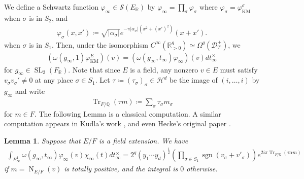 \documentclass[11pt]{article} %
\newcommand{\8}{\infty}
\newcommand{\SL}{\operatorname{SL}}
\newcommand{\KM}{\operatorname{KM}}
\newcommand{\D}{\mathcal{D}}
\newcommand{\HH}{\mathscr{H}}
\newcommand{\R}{\mathbb{R}}
\newcommand{\Q}{\mathbb{Q}}
\newcommand{\Tr}{\operatorname{Tr}}
\newcommand{\N}{\operatorname{N}}
\newcommand{\sgn}{\operatorname{sgn}}
\newcommand{\Scal}{\mathcal{S}}
\theoremstyle{mytheoremstyle}
\newtheorem{lem}[thm]{Lemma}
\theoremstyle{remark}
\numberwithin{equation}{section}
\begin{document}
\subsubsection{}  We define a Schwartz function $\varphi_\8 \in \Scal(E_\R)$ by $\varphi_\8=\prod_\sigma \varphi_\sigma$ where $\varphi_\sigma=\varphi_{\KM}^\sigma$ when $\sigma$ is in $S_2$, and 
 \begin{align}
    \varphi_\sigma(x,x') \coloneqq \sqrt{\vert \alpha_\sigma \vert} e^{- \pi \vert \alpha_\sigma \vert \left ( x^2+(x')^2\right )} \left ( x+x' \right ).
\end{align}
when $\sigma$ is in $S_1$. Then, under the isomorphism $C^\8(\R_{>0}^q) \simeq \Omega^q(\D_T^+)$, we
\begin{align}\label{equality1024}
    (\omega(g_{\8},1)\varphi^E_{\KM})(v)= (\omega(g_{\8},t_\8)\varphi_\8)(v) dt^\times_\8
\end{align}
for $g_\8 \in \SL_2(F_\R)$. Note that since $E$ is a field, any nonzero $v \in E$ must satisfy $v_\sigma v_\sigma'\neq 0$ at any place $\sigma \in S_1$.
Let $\tau \coloneqq (\tau_\sigma)_\sigma \in \HH^{d}$ be the image of $(i, \dots, i)$ by $g_\8$ and write
\begin{align}
 \Tr_{F/\Q}(\tau m) \coloneqq \sum_\sigma \tau_\sigma m_\sigma   
\end{align}
for $m \in F$. { The following Lemma is a classical computation. A similar computation appears in Kudla's work \cite{Kudla1981}, and even Hecke's original paper \cite{hecke}.
}
\begin{lem}
Suppose that $E/F$ is a field extension. We have
    \begin{align*}
        \int_{E_\8^{1}} \omega(g_{\8},t_\8)\varphi_\8(v) \chi_\8(t)dt_\8^\times = 2^q\left ( y_1 \cdots y_d\right )^{\frac{1}{2}} \left (\prod_{\sigma \in S_1} \sgn(v_\sigma+v'_\sigma) \right ) e^{2 i \pi \Tr_{F/\Q}(\tau \alpha m)}
    \end{align*}
    if $m=\N_{E/F}(v)$ is totally positive, and the integral is $0$ otherwise. 
\end{lem}
\end{document}

